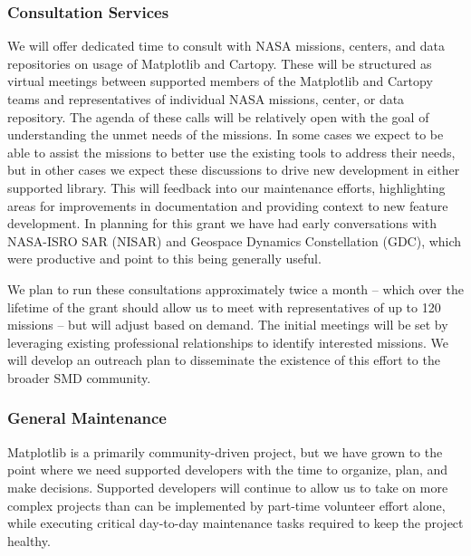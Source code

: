 \documentclass[12pt]{article}
\numberwithin{page}{section}
\begin{document}
\subsubsection{Consultation Services}

We will offer dedicated time to consult with NASA missions, centers, and data
repositories on usage of Matplotlib and Cartopy.  These will be structured as
virtual meetings between supported members of the Matplotlib and Cartopy teams
and representatives of individual NASA missions, center, or data repository.
The agenda of these calls will be relatively open with the goal of
understanding the unmet needs of the missions.  In some cases we expect to be
able to assist the missions to better use the existing tools to address their
needs, but in other cases we expect these discussions to drive new development
in either supported library.  This will feedback into our maintenance efforts,
highlighting areas for improvements in documentation and providing context to
new feature development.  In planning for this grant we have had early
conversations with NASA-ISRO SAR (NISAR) and Geospace Dynamics Constellation
(GDC), which were productive and point to this being generally useful.


We plan to run these consultations approximately twice a month -- which over
the lifetime of the grant should allow us to meet with representatives of up to
120 missions -- but will adjust based on demand.  The initial meetings will be
set by leveraging existing professional relationships to identify interested
missions.  We will develop an outreach plan to disseminate the existence of
this effort to the broader SMD community.



\subsubsection{General Maintenance}

Matplotlib is a primarily community-driven project, but we have grown to the
point where we need supported developers with the time to organize, plan, and
make decisions.  Supported developers will continue to allow us to take on more
complex projects than can be implemented by part-time volunteer effort alone,
while executing critical day-to-day maintenance tasks required to keep the
project healthy.
\end{document}
